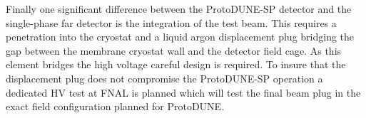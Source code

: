 Finally one significant difference between the ProtoDUNE-SP detector and the single-phase far detector is the integration of the test beam. This requires a penetration into the cryostat and a liquid argon displacement plug bridging the gap between the membrane cryostat wall and the detector field cage. As this element bridges the high voltage careful design is required. To insure that the displacement plug does not compromise the ProtoDUNE-SP operation a dedicated HV test at FNAL is planned which will test the final beam plug in the exact field configuration planned for ProtoDUNE.

